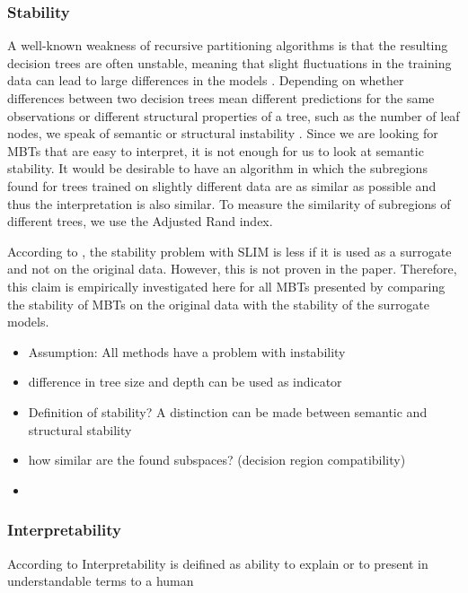 \subsubsection{Stability}
A well-known weakness of recursive partitioning algorithms is that the resulting decision trees are often unstable, meaning that slight fluctuations in the training data can lead to large differences in the models \citep{Fokkema.2020}.
Depending on whether differences between two decision trees mean different predictions for the same observations or different structural properties of a tree, such as the number of leaf nodes, we speak of semantic or structural instability \citep{Wang.2018}. 
Since we are looking for MBTs that are easy to interpret, it is not enough for us to look at semantic stability. It would be desirable to have an algorithm in which the subregions found for trees trained on slightly different data are as similar as possible and thus the interpretation is also similar.
To measure the similarity of subregions of different trees, we use the Adjusted Rand index.



According to \citep{Hu.2020}, the stability problem with SLIM is less if it is used as a surrogate and not on the original data. However, this is not proven in the paper. Therefore, this claim is empirically investigated here for all MBTs presented by comparing the stability of MBTs on the original data with the stability of the surrogate models.


\begin{itemize}
    \item Assumption: All methods have a problem with instability \citep{Fokkema.2020}
    \item difference in tree size and depth can be used as indicator \citep{Wang.2018}
    \item Definition of stability? A distinction can be made between semantic and structural stability \citep{Wang.2018}
    \item how similar are the found subspaces? (decision region compatibility) \citep{Wang.2018}

    \item 




\end{itemize}






\subsubsection{Interpretability}
According to \citet{DoshiVelez.2017} Interpretability is deifined as ability to explain or to present in understandable
terms to a human


